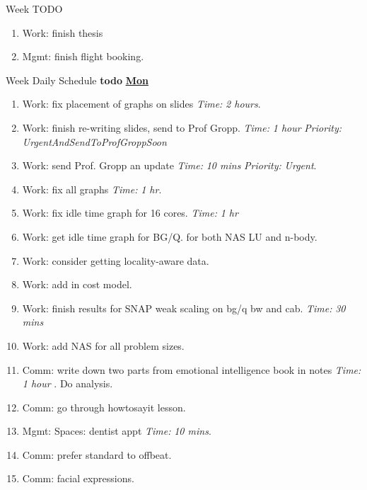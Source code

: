 \documentclass[serif, mathserif, final]{beamer}
\newcommand{\timeEst}[1]{\textit{Time:} \textit{#1}}
\newcommand{\priority}[1]{\textit{Priority:} \textit{#1}}
\begin{document}
\begin{frame}{}
\begin{columns}
\begin{column}{0.50\linewidth}
  \begin{block}{Week TODO} 
    \begin{enumerate} 
    \item Work: finish thesis 
    \item Mgmt: finish flight booking. 
    \end{enumerate}
  \end{block} 

  \begin{block}{Week Daily Schedule} 
    \textbf{todo} 
    \textbf{\small \underline{Mon}}
    \begin{enumerate} 
    \item \tiny Work: fix placement of graphs on slides \timeEst{2 hours}. 
    \item \tiny Work: finish re-writing slides, send to Prof Gropp. \timeEst{1 hour} \priority{UrgentAndSendToProfGroppSoon} 
    \item \tiny Work: send Prof. Gropp an update \timeEst{10 mins} \priority{Urgent}. 
      \tiny \item \tiny Work: fix all graphs \timeEst{1 hr}. 
    \item \tiny Work: fix idle time graph for 16 cores. \timeEst{1 hr} 
    \item \tiny Work: get idle time graph for BG/Q. for both NAS LU and n-body.
    \item \tiny Work: consider getting locality-aware data. 
    \item \tiny Work: add in cost model. 
    \item \tiny Work: finish results for SNAP weak scaling on bg/q bw and cab. \timeEst{30 mins} 
    \item \tiny Work: add NAS for all problem sizes. 
    \item \tiny Comm: write down two parts from emotional intelligence book in notes \timeEst{1 hour} . Do analysis. 
    \item \tiny Comm: go through howtosayit lesson. 
    \item \tiny Mgmt: Spaces: dentist appt \timeEst{10 mins}. 
    \item \tiny Comm: prefer standard to offbeat. 
    \item \tiny Comm: facial expressions. 

\end{enumerate}
\end{block}
\end{column}
\end{columns}
\end{frame}
\end{document}
